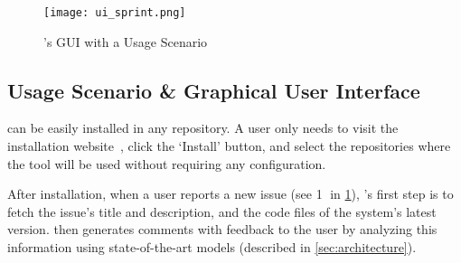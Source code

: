 
\begin{figure}[t]
    \centering
    \texttt{[image: ui\_sprint.png]}
    \caption{\toolname's GUI with a Usage Scenario}
    \label{fig:example-image}
\end{figure}

\subsection{Usage Scenario \& Graphical User Interface}

\toolname can be easily installed in any repository. A user only needs to visit the installation website~\cite{sprintUrl}, click the `Install' button, and select the repositories where the tool will be used without requiring any configuration. 

After installation, when a user reports a new issue  (see \textcircled{1} in \cref{fig:example-image}), \toolname's first step is to fetch the issue's title and description, and the code files of the system's latest version. \toolname then generates comments with feedback to the user by analyzing this information using state-of-the-art models (described in \cref{sec:architecture}). 

